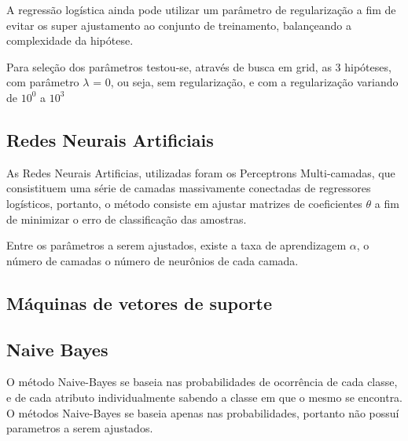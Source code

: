 A regressão logística ainda pode utilizar um parâmetro de regularização a fim de evitar os super ajustamento ao conjunto de treinamento, balançeando a complexidade da hipótese.

Para seleção dos parâmetros testou-se, através de busca em grid, as 3 hipóteses, com parâmetro \(\lambda\) = 0, ou seja, sem regularização, e com a regularização variando de \(10^0\) a \(10^3\) 

\subsection{Redes Neurais Artificiais}

As Redes Neurais Artificias, utilizadas foram os Perceptrons Multi-camadas, que consistituem uma série de camadas massivamente conectadas de regressores logísticos, portanto, o método consiste em ajustar matrizes de coeficientes \(\theta\) a fim de minimizar o erro de classificação das amostras.

Entre os parâmetros a serem ajustados, existe a taxa de aprendizagem \(\alpha\), o número de camadas o número de neurônios de cada camada.

\subsection{Máquinas de vetores de suporte}

\subsection{Naive Bayes}

O método Naive-Bayes se baseia nas probabilidades de ocorrência de cada classe, e de cada atributo individualmente sabendo a classe em que o mesmo se encontra. O métodos Naive-Bayes se baseia apenas nas probabilidades, portanto não possuí parametros a serem ajustados.

